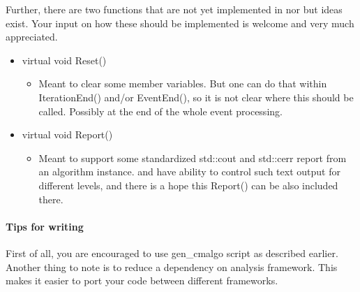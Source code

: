 Further, there are two functions that are not yet implemented in {\cmerge} nor {\cmatch} but ideas exist.
Your input on how these should be implemented is welcome and very much appreciated.
\begin{itemize}

\item[]{\ttfamily virtual void Reset()}
  \begin{itemize}
    \item Meant to clear some member variables. But one can do that within {\ttfamily IterationEnd()} and/or {\ttfamily EventEnd()}, so it is not clear where this should be called. Possibly at the end of the whole event processing.
  \end{itemize}

\item[]{\ttfamily virtual void Report()}
  \begin{itemize}
    \item Meant to support some standardized {\ttfamily std::cout} and {\ttfamily std::cerr} report from an algorithm instance. {\cmerge} and {\cmatch} have ability to control such text output for different levels, and there is a hope this {\ttfamily Report()} can be also included there.
  \end{itemize}

\end{itemize}

\paragraph{Tips for writing {\cmalgo}}
First of all, you are encouraged to use {\ttfamily gen\_cmalgo} script as described earlier.
Another thing to note is to reduce a dependency on analysis framework.
This makes it easier to port your code between different frameworks.

